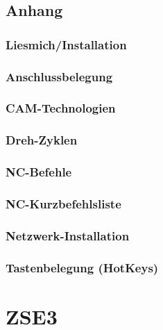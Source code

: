 \documentclass[14pt,a4paper]{book}
\begin{document}
\chapter{Anhang}
	\section{Liesmich/Installation} 
	\section{Anschlussbelegung} 
	\section{CAM-Technologien} 
	\section{Dreh-Zyklen} 
	\section{NC-Befehle} 
	\section{NC-Kurzbefehlsliste} 
	\section{Netzwerk-Installation} 
	\section{Tastenbelegung (HotKeys)} 
 
 
\part{ZSE3}
\end{document}
